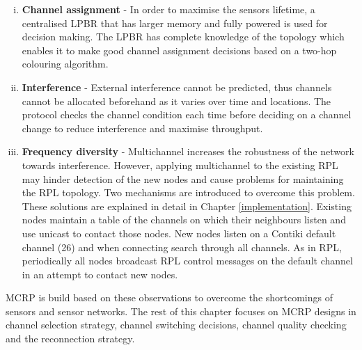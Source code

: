 \begin{enumerate}[i. ]
\item \textbf{Channel assignment} - In order to maximise the sensors lifetime, a centralised LPBR that has larger memory and fully powered is used for decision making. The LPBR has complete knowledge of the topology which enables it to make good channel assignment decisions based on a two-hop colouring algorithm.


\item \textbf{Interference} - External interference cannot be predicted, thus channels cannot be allocated beforehand as it varies over time and locations. The protocol checks the channel condition each time before deciding on a channel change to reduce interference and maximise throughput. 


\item \textbf{Frequency diversity} - Multichannel increases the robustness of the network towards interference. However, applying multichannel to the existing RPL may hinder detection of the new nodes and cause problems for maintaining the RPL topology. Two mechanisms are introduced to overcome this problem. These solutions are explained in detail in Chapter \ref{implementation}.
Existing nodes maintain a table of the channels on which their neighbours listen and use unicast to contact those nodes. New nodes listen on a Contiki default channel (26) and when connecting search through all channels. As in RPL, periodically all nodes broadcast RPL control messages on the default channel in an attempt to contact new nodes.
\end{enumerate}


MCRP is build based on these observations to overcome the shortcomings of sensors and sensor networks. The rest of this chapter focuses on MCRP designs in channel selection strategy, channel switching decisions, channel quality checking and the reconnection strategy.


